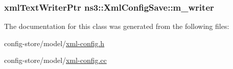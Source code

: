 \subsubsection[{\texorpdfstring{m\+\_\+writer}{m_writer}}]{\setlength{\rightskip}{0pt plus 5cm}xml\+Text\+Writer\+Ptr ns3\+::\+Xml\+Config\+Save\+::m\+\_\+writer\hspace{0.3cm}{\ttfamily [private]}}\hypertarget{classns3_1_1XmlConfigSave_a838ec47c15d124d23133a8e633c40397}{}\label{classns3_1_1XmlConfigSave_a838ec47c15d124d23133a8e633c40397}


The documentation for this class was generated from the following files\+:\begin{DoxyCompactItemize}
\item 
config-\/store/model/\hyperlink{xml-config_8h}{xml-\/config.\+h}\item 
config-\/store/model/\hyperlink{xml-config_8cc}{xml-\/config.\+cc}\end{DoxyCompactItemize}
